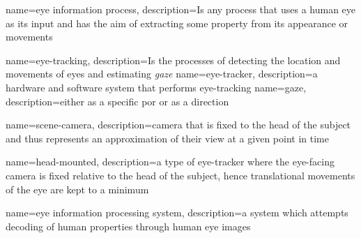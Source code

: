 \makenoidxglossaries


{
    name={eye information process},
    description={Is any process that uses a human eye as its input and has the aim of extracting some property from its appearance or movements}
}

{
    name=eye-tracking,
    description={Is the processes of detecting the location and movements of eyes and estimating \emph{gaze}}
}
{
	name=eye-tracker,
	description={a hardware and software system that performs \gls{eye-tracking}}
}
{
    name=gaze,
    description={either as a specific \acrfull{por} or as a direction}
}

{
	name=scene-camera,
	description={camera that is fixed to the head of the subject and thus represents an approximation of their view at a given point in time}
}

{
	name=head-mounted,
	description={a type of \gls{eye-tracker} where the eye-facing camera is fixed relative to the head of the subject, hence translational movements of the eye are kept to a minimum}
}

{
	name=eye information processing system,
	description={a system which attempts decoding of human properties through human eye images}
}




\usepackage{etoolbox}
\renewcommand\nomgroup[1]{%
  \item[\bfseries
  \ifstrequal{#1}{E}{Eye processing model sets}{%
  \ifstrequal{#1}{T}{Terminology}{%
  \ifstrequal{#1}{O}{Other Symbols}{}}}%
]}

\makenomenclature


